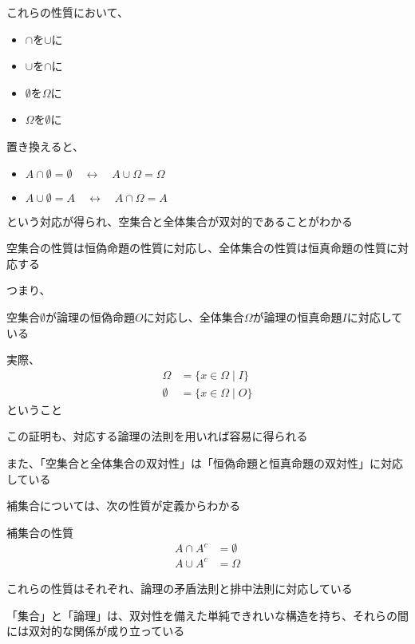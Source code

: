 \documentclass[b5paper,12pt]{jsarticle}
\begin{document}
これらの性質において、
\begin{itemize}
  \item $\cap$を$\cup$に
  \item $\cup$を$\cap$に
  \item $\emptyset$を$\Omega$に
  \item $\Omega$を$\emptyset$に
\end{itemize}
置き換えると、
\begin{itemize}
  \item $A \cap \emptyset = \emptyset \quad \leftrightarrow \quad A \cup \Omega = \Omega$
  \item $A \cup \emptyset = A \quad \leftrightarrow \quad A \cap \Omega = A$
\end{itemize}
という対応が得られ、空集合と全体集合が双対的であることがわかる

\sectionline

空集合の性質は恒偽命題の性質に対応し、全体集合の性質は恒真命題の性質に対応する

\br

つまり、
\begin{shaded}
  空集合$\emptyset$が論理の恒偽命題$O$に対応し、全体集合$\Omega$が論理の恒真命題$I$に対応している
\end{shaded}

実際、
\begin{align*}
  \Omega    & = \{x \in \Omega \mid I\} \\
  \emptyset & = \{x \in \Omega \mid O\}
\end{align*}
ということ

この証明も、対応する論理の法則を用いれば容易に得られる

\br

また、「空集合と全体集合の双対性」は「恒偽命題と恒真命題の双対性」に対応している

\sectionline

補集合については、次の性質が定義からわかる

\begin{theorem}{補集合の性質}
  \begin{align*}
    A \cap A^c & = \emptyset \\
    A \cup A^c & = \Omega
  \end{align*}
\end{theorem}

これらの性質はそれぞれ、論理の矛盾法則と排中法則に対応している

\sectionline

「集合」と「論理」は、双対性を備えた単純できれいな構造を持ち、それらの間には双対的な関係が成り立っている
\end{document}
